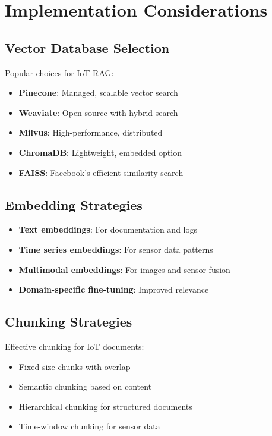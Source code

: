 \documentclass[12pt,a4paper]{article}
\begin{document}
\section{Implementation Considerations}

\subsection{Vector Database Selection}

Popular choices for IoT RAG:
\begin{itemize}
    \item \textbf{Pinecone}: Managed, scalable vector search
    \item \textbf{Weaviate}: Open-source with hybrid search
    \item \textbf{Milvus}: High-performance, distributed
    \item \textbf{ChromaDB}: Lightweight, embedded option
    \item \textbf{FAISS}: Facebook's efficient similarity search
\end{itemize}

\subsection{Embedding Strategies}

\begin{tcolorbox}[colback=retrievalblue!10, colframe=retrievalblue, title=Embedding Considerations for IoT]
\begin{itemize}
    \item \textbf{Text embeddings}: For documentation and logs
    \item \textbf{Time series embeddings}: For sensor data patterns
    \item \textbf{Multimodal embeddings}: For images and sensor fusion
    \item \textbf{Domain-specific fine-tuning}: Improved relevance
\end{itemize}
\end{tcolorbox}

\subsection{Chunking Strategies}

Effective chunking for IoT documents:
\begin{itemize}
    \item Fixed-size chunks with overlap
    \item Semantic chunking based on content
    \item Hierarchical chunking for structured documents
    \item Time-window chunking for sensor data
\end{itemize}
\end{document}
